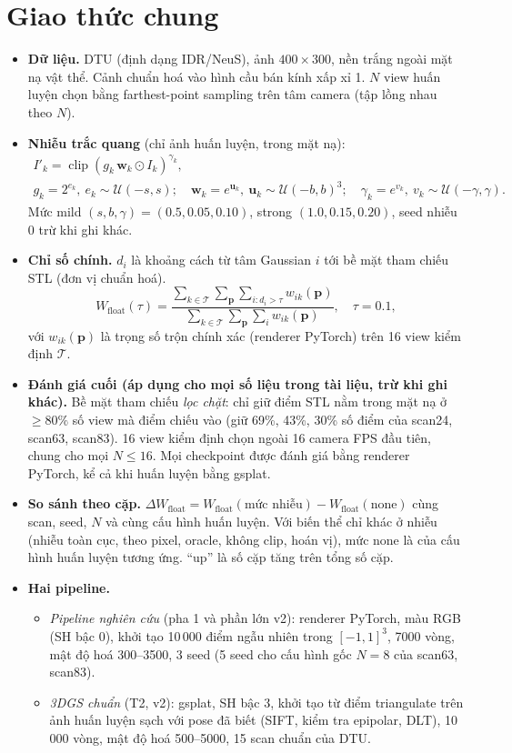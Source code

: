 \documentclass[11pt,a4paper]{article}
\newcommand{\W}{W_{\text{float}}}
\newcommand{\dW}{\Delta W_{\text{float}}}
\begin{document}
\section{Giao thức chung}
\label{sec:protocol}
\begin{itemize}
  \item \textbf{Dữ liệu.} DTU (định dạng IDR/NeuS), ảnh $400\times300$, nền trắng ngoài mặt nạ vật thể. Cảnh chuẩn hoá vào hình cầu bán kính xấp xỉ 1. $N$ view huấn luyện chọn bằng farthest-point sampling trên tâm camera (tập lồng nhau theo $N$).
  \item \textbf{Nhiễu trắc quang} (chỉ ảnh huấn luyện, trong mặt nạ):
  \begin{gather*} I'_k=\operatorname{clip}(g_k\,\mathbf{w}_k\odot I_k)^{\gamma_k},\\
  g_k=2^{e_k},\ e_k\sim\mathcal U(-s,s);\quad \mathbf{w}_k=e^{\mathbf u_k},\ \mathbf u_k\sim\mathcal U(-b,b)^3;\quad \gamma_k=e^{v_k},\ v_k\sim\mathcal U(-\gamma,\gamma). \end{gather*}
  Mức mild $(s,b,\gamma)=(0.5,0.05,0.10)$, strong $(1.0,0.15,0.20)$, seed nhiễu 0 trừ khi ghi khác.
  \item \textbf{Chỉ số chính.} $d_i$ là khoảng cách từ tâm Gaussian $i$ tới bề mặt tham chiếu STL (đơn vị chuẩn hoá).
  \[ \W(\tau)=\frac{\sum_{k\in\mathcal T}\sum_{\mathbf p}\sum_{i:d_i>\tau}w_{ik}(\mathbf p)}{\sum_{k\in\mathcal T}\sum_{\mathbf p}\sum_i w_{ik}(\mathbf p)},\quad \tau=0.1, \]
  với $w_{ik}(\mathbf p)$ là trọng số trộn chính xác (renderer PyTorch) trên 16 view kiểm định $\mathcal T$.
  \item \textbf{Đánh giá cuối (áp dụng cho mọi số liệu trong tài liệu, trừ khi ghi khác).} Bề mặt tham chiếu \emph{lọc chặt}: chỉ giữ điểm STL nằm trong mặt nạ ở $\ge 80\%$ số view mà điểm chiếu vào (giữ 69\%, 43\%, 30\% số điểm của scan24, scan63, scan83). 16 view kiểm định chọn ngoài 16 camera FPS đầu tiên, chung cho mọi $N\le16$. Mọi checkpoint được đánh giá bằng renderer PyTorch, kể cả khi huấn luyện bằng gsplat.
  \item \textbf{So sánh theo cặp.} $\dW=\W(\text{mức nhiễu})-\W(\text{none})$ cùng scan, seed, $N$ và cùng cấu hình huấn luyện. Với biến thể chỉ khác ở nhiễu (nhiễu toàn cục, theo pixel, oracle, không clip, hoán vị), mức none là của cấu hình huấn luyện tương ứng. ``up'' là số cặp tăng trên tổng số cặp.
  \item \textbf{Hai pipeline.}
  \begin{itemize}
    \item \emph{Pipeline nghiên cứu} (pha 1 và phần lớn v2): renderer PyTorch, màu RGB (SH bậc 0), khởi tạo 10\,000 điểm ngẫu nhiên trong $[-1,1]^3$, 7000 vòng, mật độ hoá 300--3500, 3 seed (5 seed cho cấu hình gốc $N=8$ của scan63, scan83).
    \item \emph{3DGS chuẩn} (T2, v2): gsplat, SH bậc 3, khởi tạo từ điểm triangulate trên ảnh huấn luyện sạch với pose đã biết (SIFT, kiểm tra epipolar, DLT), 10\,000 vòng, mật độ hoá 500--5000, 15 scan chuẩn của DTU.
  \end{itemize}
\end{itemize}
\end{document}
